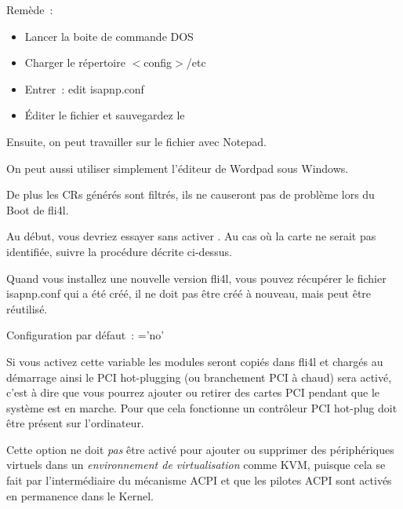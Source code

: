 
  Remède~:
  \begin{itemize}
  \item Lancer la boite de commande DOS
  \item Charger le répertoire $<$config$>$/etc
  \item Entrer~: edit isapnp.conf
  \item Éditer le fichier et sauvegardez le
  \end{itemize}

  Ensuite, on peut travailler sur le fichier avec Notepad.

  On peut aussi utiliser simplement l'éditeur de Wordpad sous Windows.

  De plus les CRs générés sont filtrés, ils ne causeront pas de
  problème lors du Boot de fli4l.

  Au début, vous devriez essayer sans activer . Au cas où
  la carte ne serait pas identifiée, suivre la procédure décrite ci-dessus.

  Quand vous installez une nouvelle version fli4l, vous pouvez récupérer le
  fichier \hbox{isapnp.conf} qui a été créé, il ne doit pas être créé à nouveau,
  mais peut être réutilisé.

  Configuration par défaut~: ='no'


  Si vous activez cette variable  les
  modules seront copiés dans fli4l et chargés au démarrage ainsi le PCI hot-plugging
  (ou branchement PCI à chaud) sera activé, c'est à dire que vous pourrez ajouter
  ou retirer des cartes PCI pendant que le système est en marche. Pour que
  cela fonctionne un contrôleur PCI hot-plug doit être présent sur l'ordinateur.

  Cette option ne doit \emph{pas} être activé pour ajouter ou supprimer des périphériques
  virtuels dans un \emph{environnement de virtualisation} comme KVM, puisque cela
  se fait par l'intermédiaire du mécanisme ACPI et que les pilotes ACPI sont activés en
  permanence dans le Kernel.
